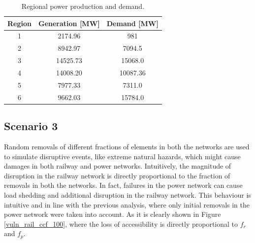 \documentclass[review]{elsarticle}
\begin{document}
	\begin{table}[h]
	\centering
	\caption{Regional power production and demand.}
	\begin{tabular}[t]{ccc}
		\hline
		\textbf{Region}& \textbf{Generation [MW]} & \textbf{Demand [MW]}\\
		\hline
		1 & 2174.96 & 981   \\
		2 & 8942.97 & 7094.5  \\
		3 & 14525.73 &  15068.0  \\
		4 & 14008.20 & 10087.36  \\
		5 & 7977.33 & 7311.0 \\
		6 & 9662.03 & 15784.0 \\
		\hline
	\end{tabular}
	\label{regions_features}
\end{table}%
\subsection{Scenario 3}
Random removals of different fractions of elements in both the networks are used to simulate disruptive events, like extreme natural hazards, which might cause damages in both railway and power networks. Intuitively, the magnitude of disruption in the railway network is directly proportional to the fraction of removals in both the networks. In fact, failures in the power network can cause load shedding and additional disruption in the railway network. This behaviour is intuitive and in line with the previous analysis, where only initial removals in the power network were taken into account. As it is clearly shown in Figure \ref{vuln_rail_ccf_100}, where the loss of accessibility is directly proportional to $f_r$ and $f_p$.
\end{document}
